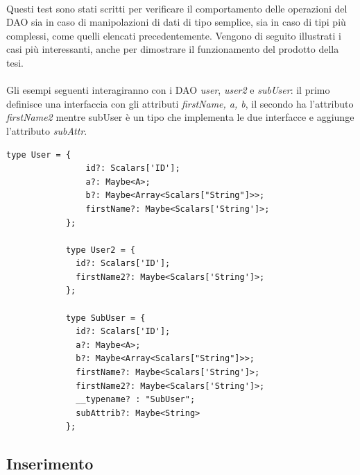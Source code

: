 \documentclass[a4paper, 12pt]{report}
\begin{document}
        \paragraph*{}
          Questi test sono stati scritti per verificare il comportamento delle operazioni del DAO sia in caso di manipolazioni di dati di tipo semplice, sia in caso di tipi più complessi, come quelli elencati precedentemente.
          Vengono di seguito illustrati i casi più interessanti, anche per dimostrare il funzionamento del prodotto della tesi.
          \paragraph*{}
          Gli esempi seguenti interagiranno con i DAO \emph{user}, \emph{user2} e \emph{subUser}: il primo definisce una interfaccia con gli attributi \emph{firstName, a, b}, il secondo ha l'attributo \emph{firstName2} mentre subUser è un tipo che implementa le due interfacce e aggiunge l'attributo \emph{subAttr}.
          \begin{Verbatim}[samepage=true]
            type User = {
                id?: Scalars['ID'];
                a?: Maybe<A>;
                b?: Maybe<Array<Scalars["String"]>>;
                firstName?: Maybe<Scalars['String']>;
            };
            
            type User2 = {
              id?: Scalars['ID'];
              firstName2?: Maybe<Scalars['String']>;
            };
            
            type SubUser = {
              id?: Scalars['ID'];
              a?: Maybe<A>;
              b?: Maybe<Array<Scalars["String"]>>;
              firstName?: Maybe<Scalars['String']>;
              firstName2?: Maybe<Scalars['String']>;
              __typename? : "SubUser";
              subAttrib?: Maybe<String>
            };

          \end{Verbatim}
        \subsection{Inserimento}
\end{document}
